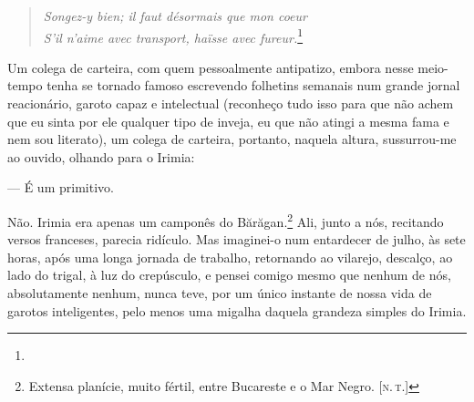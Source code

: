 
\begin{verse}
\emph{Songez-y bien; il faut désormais que mon coeur}\\
\emph{S'il n'aime avec transport, haïsse avec fureur.}\footnote{}
\end{verse}


Um colega de carteira, com quem pessoalmente antipatizo, embora nesse
meio-tempo tenha se tornado famoso escrevendo folhetins semanais num
grande jornal reacionário, garoto capaz e intelectual (reconheço tudo
isso para que não achem que eu sinta por ele qualquer tipo de inveja, eu
que não atingi a mesma fama e nem sou literato), um colega de carteira,
portanto, naquela altura, sussurrou-me ao ouvido, olhando para o Irimia:

--- É um primitivo.

Não. Irimia era apenas um camponês do Bărăgan.\footnote{Extensa
  planície, muito fértil, entre Bucareste e o Mar Negro.
  {[}\textsc{n.\,t.}{]}} Ali, junto a nós, recitando versos franceses,
parecia ridículo. Mas imaginei-o num entardecer de julho, às sete horas,
após uma longa jornada de trabalho, retornando ao vilarejo, descalço, ao
lado do trigal, à luz do crepúsculo, e pensei comigo mesmo que nenhum de
nós, absolutamente nenhum, nunca teve, por um único instante de nossa
vida de garotos inteligentes, pelo menos uma migalha daquela grandeza
simples do Irimia.

